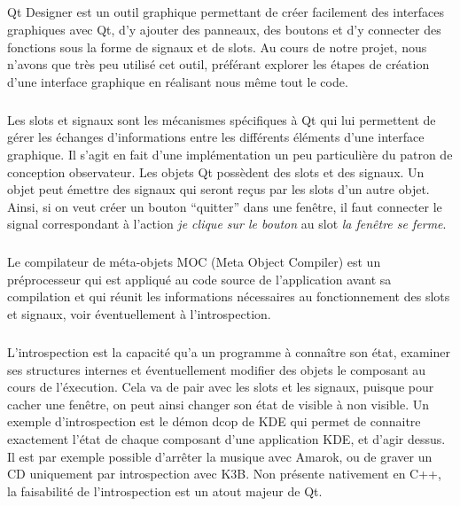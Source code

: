 \subparagraph{}
Qt Designer est un outil graphique permettant de créer facilement des interfaces graphiques avec Qt, d'y ajouter des panneaux, des boutons et d'y connecter des fonctions sous la forme de signaux et de slots. Au cours de notre projet, nous n'avons que tr\`es peu utilis\'e cet outil, pr\'ef\'erant explorer les \'etapes de cr\'eation d'une interface graphique en r\'ealisant nous m\^eme tout le code.
\subparagraph{}
Les slots et signaux sont les m\'ecanismes sp\'ecifiques \`a Qt qui lui permettent de g\'erer les \'echanges d'informations entre les diff\'erents \'el\'ements d'une interface graphique. Il s'agit en fait d'une impl\'ementation un peu particulière du patron de conception observateur.
Les objets Qt poss\`edent des slots et des signaux. Un objet peut \'emettre des signaux qui seront re\c cus par les slots d'un autre objet. Ainsi, si on veut cr\'eer un bouton ``quitter'' dans une fen\^etre, il faut connecter le signal correspondant à l'action \textit{je clique sur le bouton} au slot \textit{la fen\^etre se ferme}.
\subparagraph{}
Le compilateur de m\'eta-objets MOC (Meta Object Compiler) est un pr\'eprocesseur qui est appliqu\'e au code source de l'application avant sa compilation et qui r\'eunit les informations n\'ecessaires au fonctionnement des slots et signaux, voir \'eventuellement \`a l'introspection. \subparagraph{}
L'introspection est la capacit\'e qu'a un programme à connaître son \'etat, examiner ses structures internes et \'eventuellement modifier des objets le composant au cours de l'\'execution. Cela va de pair avec les slots et les signaux, puisque pour cacher une fen\^etre, on peut ainsi changer son \'etat de visible \`a non visible.
Un exemple d'introspection est le démon dcop de KDE qui permet de connaitre exactement l'état de chaque composant d'une application KDE, et d'agir dessus. Il est par exemple possible d'arrêter la musique avec Amarok, ou de graver un CD uniquement par introspection avec K3B.
Non présente nativement en C++, la faisabilité de l'introspection est un atout majeur de Qt.